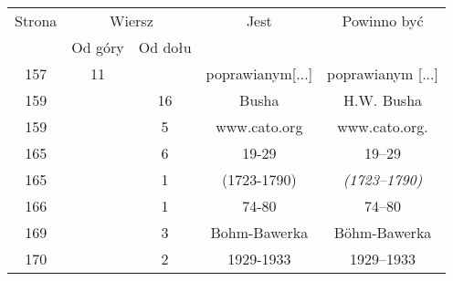 \documentclass[a4paper,11pt]{article}
\numberwithin{equation}{section}
\begin{document}
\begin{center}

  \begin{tabular}{|c|c|c|c|c|}
    \hline
    Strona & \multicolumn{2}{c|}{Wiersz} & Jest
                              & Powinno być \\ \cline{2-3}
    & Od góry & Od dołu & & \\
    \hline
    157 & 11 & & poprawianym[...] & poprawianym [...] \\
    159 & & 16 & Busha & H.W. Busha \\
    159 & &  5 & www.cato.org & www.cato.org. \\
    165 & &  6 & 19-29 & 19--29 \\
    165 & &  1 & (1723-1790) & \textit{(1723--1790)} \\
    166 & &  1 & 74-80 & 74--80 \\
    169 & &  3 & Bohm-Bawerka & B\"{o}hm-Bawerka \\
    170 & &  2 & 1929-1933 & 1929--1933 \\
    \hline
  \end{tabular}






\end{center}
\end{document}
